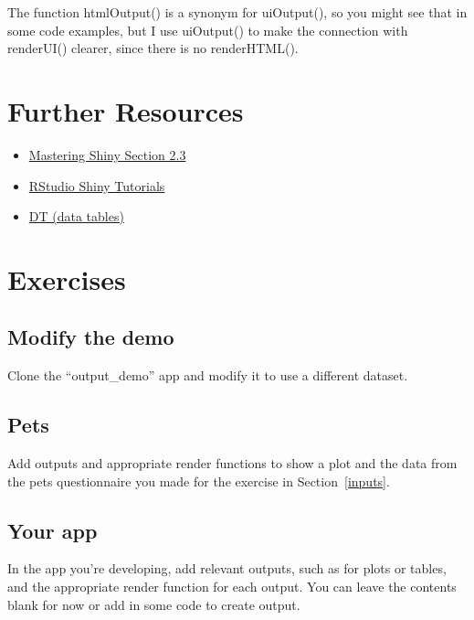 \documentclass[
]{book}
\providecommand{\tightlist}{%
  \setlength{\itemsep}{0pt}\setlength{\parskip}{0pt}}
\begin{document}
The function htmlOutput() is a synonym for uiOutput(), so you might see that in some code examples, but I use uiOutput() to make the connection with renderUI() clearer, since there is no renderHTML().

\hypertarget{reosurces-outputs}{%
\section{Further Resources}\label{reosurces-outputs}}

\begin{itemize}
\tightlist
\item
  \href{https://mastering-shiny.org/basic-ui.html\#outputs}{Mastering Shiny Section 2.3}
\item
  \href{https://vimeo.com/rstudioinc/review/131218530/212d8a5a7a/\#t=10m41s}{RStudio Shiny Tutorials}
\item
  \href{https://rstudio.github.io/DT/}{DT (data tables)}
\end{itemize}

\hypertarget{exercises-outputs}{%
\section{Exercises}\label{exercises-outputs}}

\hypertarget{modify-the-demo}{%
\subsection{Modify the demo}\label{modify-the-demo}}

Clone the ``output\_demo'' app and modify it to use a different dataset.

\hypertarget{pets-1}{%
\subsection{Pets}\label{pets-1}}

Add outputs and appropriate render functions to show a plot and the data from the pets questionnaire you made for the exercise in Section~\ref{inputs}.

\hypertarget{your-app}{%
\subsection{Your app}\label{your-app}}

In the app you're developing, add relevant outputs, such as for plots or tables, and the appropriate render function for each output. You can leave the contents blank for now or add in some code to create output.
\end{document}
